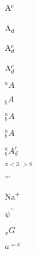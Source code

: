 \documentclass{article}
\begin{document}
A$^c$

A$_d$

A$^c_d$

A$_d^c$


$^aA$

$_bA$

$^a_bA$

$_b^aA$

$_b^aA^c_d$

$_{x<3,>0}$

$^{\prime\prime\prime}$

$\mathrm{Na}^+$ 

$\psi^{\prime\prime}$

$ _{\mathord{x}}\mathord{G} $

$ a^{= x}$
\end{document}
